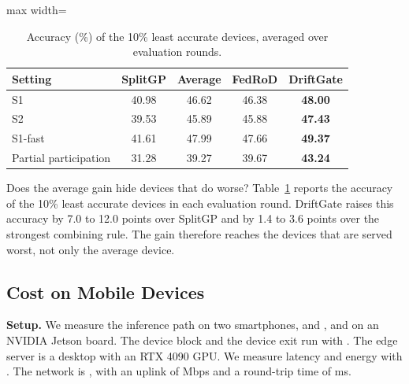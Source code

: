 \begin{table}[t]
\centering
\caption{Accuracy (\%) of the 10\% least accurate devices, averaged over evaluation rounds.}
\label{tab:bottom}
\begin{adjustbox}{max width=\columnwidth}
\begin{tabular}{lcccc}
\toprule
Setting & SplitGP & Average & FedRoD & DriftGate \\
\midrule
S1 & 40.98 & 46.62 & 46.38 & \textbf{48.00} \\
S2 & 39.53 & 45.89 & 45.88 & \textbf{47.43} \\
S1-fast & 41.61 & 47.99 & 47.66 & \textbf{49.37} \\
Partial participation & 31.28 & 39.27 & 39.67 & \textbf{43.24} \\
\bottomrule
\end{tabular}
\end{adjustbox}
\end{table}

Does the average gain hide devices that do worse? Table~\ref{tab:bottom} reports the accuracy of the 10\% least accurate devices in each evaluation round. DriftGate raises this accuracy by 7.0 to 12.0 points over SplitGP and by 1.4 to 3.6 points over the strongest combining rule. The gain therefore reaches the devices that are served worst, not only the average device.

\subsection{Cost on Mobile Devices}
\label{sec:device}


\textbf{Setup.} We measure the inference path on two smartphones,  and , and on an NVIDIA Jetson  board. The device block and the device exit run with . The edge server is a desktop with an RTX 4090 GPU. We measure latency  and energy with . The network is , with an uplink of  Mbps and a round-trip time of  ms.

